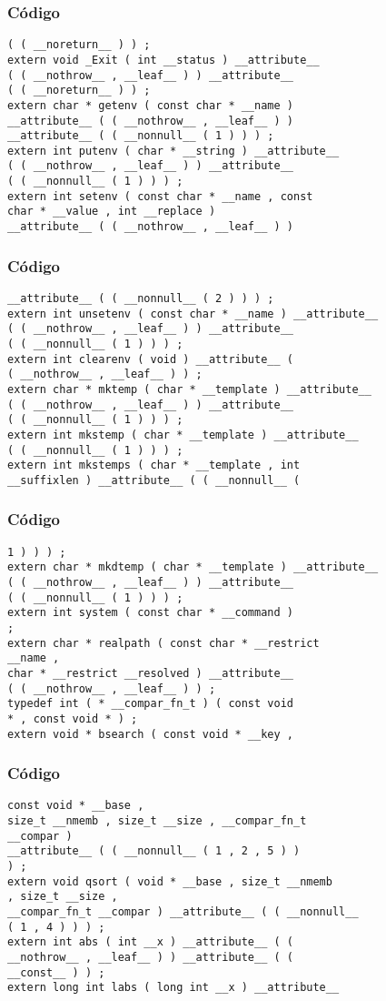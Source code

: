 \documentclass{beamer}
\begin{document}
\begin{frame}[fragile]
\frametitle{C\'odigo}
\begin{verbatim}
( ( __noreturn__ ) ) ; 
extern void _Exit ( int __status ) __attribute__ 
( ( __nothrow__ , __leaf__ ) ) __attribute__ 
( ( __noreturn__ ) ) ; 
extern char * getenv ( const char * __name ) 
__attribute__ ( ( __nothrow__ , __leaf__ ) ) 
__attribute__ ( ( __nonnull__ ( 1 ) ) ) ; 
extern int putenv ( char * __string ) __attribute__ 
( ( __nothrow__ , __leaf__ ) ) __attribute__ 
( ( __nonnull__ ( 1 ) ) ) ; 
extern int setenv ( const char * __name , const 
char * __value , int __replace ) 
__attribute__ ( ( __nothrow__ , __leaf__ ) ) 
\end{verbatim}
\end{frame}
\begin{frame}[fragile]
\frametitle{C\'odigo}
\begin{verbatim}
__attribute__ ( ( __nonnull__ ( 2 ) ) ) ; 
extern int unsetenv ( const char * __name ) __attribute__ 
( ( __nothrow__ , __leaf__ ) ) __attribute__ 
( ( __nonnull__ ( 1 ) ) ) ; 
extern int clearenv ( void ) __attribute__ ( 
( __nothrow__ , __leaf__ ) ) ; 
extern char * mktemp ( char * __template ) __attribute__ 
( ( __nothrow__ , __leaf__ ) ) __attribute__ 
( ( __nonnull__ ( 1 ) ) ) ; 
extern int mkstemp ( char * __template ) __attribute__ 
( ( __nonnull__ ( 1 ) ) ) ; 
extern int mkstemps ( char * __template , int 
__suffixlen ) __attribute__ ( ( __nonnull__ ( 
\end{verbatim}
\end{frame}
\begin{frame}[fragile]
\frametitle{C\'odigo}
\begin{verbatim}
1 ) ) ) ; 
extern char * mkdtemp ( char * __template ) __attribute__ 
( ( __nothrow__ , __leaf__ ) ) __attribute__ 
( ( __nonnull__ ( 1 ) ) ) ; 
extern int system ( const char * __command ) 
; 
extern char * realpath ( const char * __restrict 
__name , 
char * __restrict __resolved ) __attribute__ 
( ( __nothrow__ , __leaf__ ) ) ; 
typedef int ( * __compar_fn_t ) ( const void 
* , const void * ) ; 
extern void * bsearch ( const void * __key , 
\end{verbatim}
\end{frame}
\begin{frame}[fragile]
\frametitle{C\'odigo}
\begin{verbatim}
const void * __base , 
size_t __nmemb , size_t __size , __compar_fn_t 
__compar ) 
__attribute__ ( ( __nonnull__ ( 1 , 2 , 5 ) ) 
) ; 
extern void qsort ( void * __base , size_t __nmemb 
, size_t __size , 
__compar_fn_t __compar ) __attribute__ ( ( __nonnull__ 
( 1 , 4 ) ) ) ; 
extern int abs ( int __x ) __attribute__ ( ( 
__nothrow__ , __leaf__ ) ) __attribute__ ( ( 
__const__ ) ) ; 
extern long int labs ( long int __x ) __attribute__ 
\end{verbatim}
\end{frame}
\end{document}
